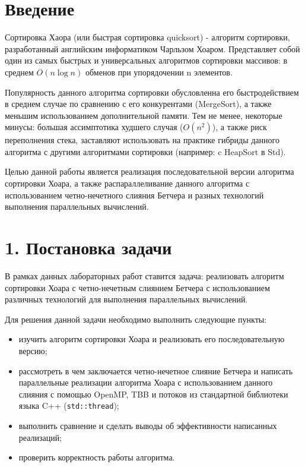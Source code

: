 \documentclass{report}
\begin{document}
\section*{Введение}
\par Сортировка Хаора (или быстрая сортировка quicksort) - алгоритм сортировки, разработанный английским информатиком Чарльзом Хоаром. Представляет собой один из самых быстрых и универсальных алгоритмов сортировки массивов: в среднем $O(n\log n)$ обменов при упорядочении n элементов.
\par Популярность данного алгоритма сортировки обусловленна его быстродействием в среднем случае по сравнению с его конкурентами (MergeSort), а также меньшим использованием дополнительной памяти. Тем не менее, некоторые минусы: большая ассимптотика худшего случая ($O(n^2)$), а также риск переполнения стека, заставляют использовать на практике гибриды данного алгоритма с другими алгоритмами сортировки (например: c HeapSort в Std).
\par Целью данной работы является реализация последовательной версии алгоритма сортировки Хоара, а также распараллеливание данного алгоритма с использованием четно-нечетного слияния Бетчера и разных технологий выполнения параллельных вычислений.


\newpage
\section*{1. Постановка задачи}
В рамках данных лабораторных работ ставится задача: реализовать алгоритм сортировки Хоара с четно-нечетным слиянием Бетчера с использованием различных технологий для выполнения параллельных вычислений.
\par Для решения данной задачи необходимо выполнить следующие пункты:
\begin{itemize}
\item изучить алгоритм сортировки Хоара и реализовать его последовательную версию;
\item рассмотреть в чем заключается четно-нечетное слияние Бетчера и написать параллельные реализации алгоритма Хоара с использованием данного слияния с помощью OpenMP, TBB и потоков из стандартной библиотеки языка C++ (\verb|std::thread|);
\item выполнить сравнение и сделать выводы об эффективности написанных реализаций;
\item проверить корректность работы алгоритма.
\end{itemize}
\end{document}
